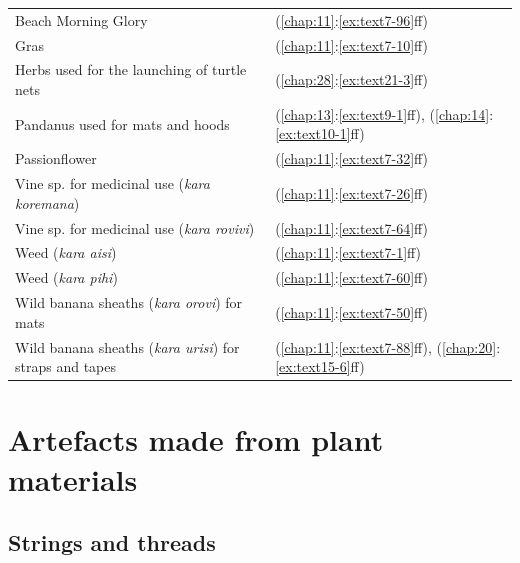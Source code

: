 \begin{tabularx}{\textwidth}{p{7cm}X}
    Beach Morning Glory&(\ref{chap:11}:\ref{ex:text7-96}ff)\\
    Gras& (\ref{chap:11}:\ref{ex:text7-10}ff)\\
    Herbs used for the launching of turtle nets&(\ref{chap:28}:\ref{ex:text21-3}ff)\\
    Pandanus used for mats and hoods&(\ref{chap:13}:\ref{ex:text9-1}ff), (\ref{chap:14}:\ref{ex:text10-1}ff)\\
    Passionflower&(\ref{chap:11}:\ref{ex:text7-32}ff)\\
    Vine sp. for medicinal use (\textit{kara koremana})&(\ref{chap:11}:\ref{ex:text7-26}ff)\\
    Vine sp. for medicinal use (\textit{kara rovivi})&(\ref{chap:11}:\ref{ex:text7-64}ff)\\
    Weed (\textit{kara aisi})&(\ref{chap:11}:\ref{ex:text7-1}ff)\\
    Weed (\textit{kara pihi})&(\ref{chap:11}:\ref{ex:text7-60}ff)\\
    Wild banana sheaths (\textit{kara orovi}) for mats&(\ref{chap:11}:\ref{ex:text7-50}ff)\\
    Wild banana sheaths (\textit{kara urisi}) for straps and tapes&(\ref{chap:11}:\ref{ex:text7-88}ff), (\ref{chap:20}:\ref{ex:text15-6}ff)\\
\end{tabularx}

\section{Artefacts made from plant materials}\label{ind:artefacts}
\subsection{Strings and threads}

